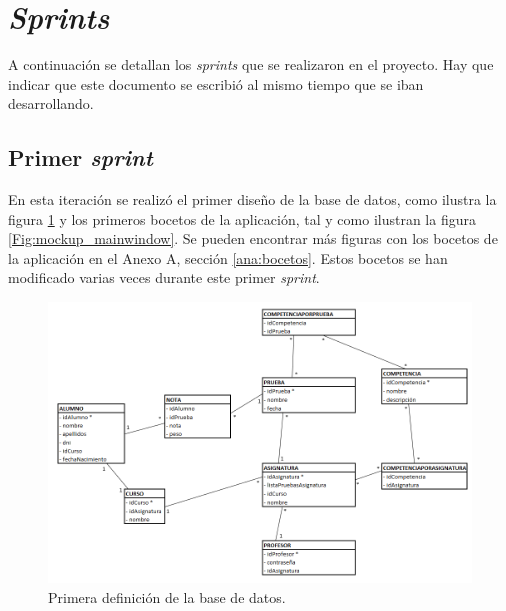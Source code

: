 \newpage
\section{\textit{Sprints}}

A continuación se detallan los \textit{sprints} que se realizaron en el proyecto. Hay que indicar que este documento se escribió al mismo tiempo que se iban desarrollando.

\subsection{Primer \textit{sprint}}

En esta iteración se realizó el primer diseño de la base de datos, como ilustra la figura \ref{Fig:db_definition1} y los primeros bocetos de la aplicación, tal y como ilustran la figura \ref{Fig:mockup_mainwindow}. Se pueden encontrar más figuras con los bocetos de la aplicación en el Anexo A, sección \ref{ana:bocetos}. Estos bocetos se han modificado varias veces durante este primer \textit{sprint}.


\begin{figure}[h]
\centering\includegraphics[width=1\linewidth]{figs/DB_Definition_1.png}
\caption{Primera definición de la base de datos.}
\label{Fig:db_definition1}
\end{figure}


